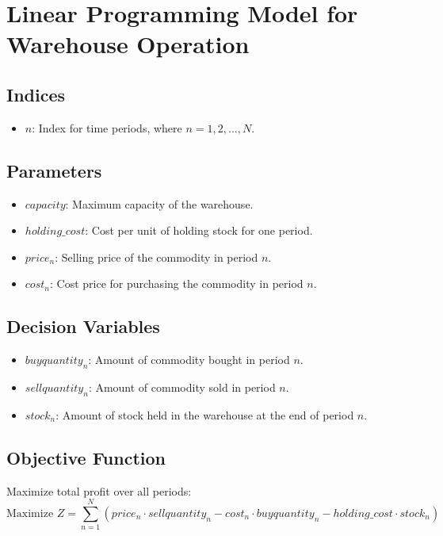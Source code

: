 \documentclass{article}
\begin{document}
\section*{Linear Programming Model for Warehouse Operation}

\subsection*{Indices}
\begin{itemize}
    \item $n$: Index for time periods, where $n = 1, 2, \ldots, N$.
\end{itemize}

\subsection*{Parameters}
\begin{itemize}
    \item $capacity$: Maximum capacity of the warehouse.
    \item $holding\_cost$: Cost per unit of holding stock for one period.
    \item $price_n$: Selling price of the commodity in period $n$.
    \item $cost_n$: Cost price for purchasing the commodity in period $n$.
\end{itemize}

\subsection*{Decision Variables}
\begin{itemize}
    \item $buyquantity_n$: Amount of commodity bought in period $n$.
    \item $sellquantity_n$: Amount of commodity sold in period $n$.
    \item $stock_n$: Amount of stock held in the warehouse at the end of period $n$.
\end{itemize}

\subsection*{Objective Function}
Maximize total profit over all periods:
\[
\text{Maximize } Z = \sum_{n=1}^{N} (price_n \cdot sellquantity_n - cost_n \cdot buyquantity_n - holding\_cost \cdot stock_n)
\]
\end{document}

